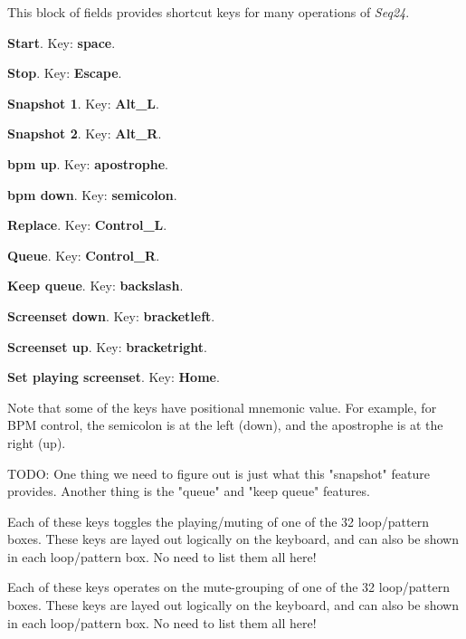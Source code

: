    This block of fields provides shortcut keys for many operations of
   \textsl{Seq24}.

   \begin{enumber}
      \item \textbf{Start}.
         Key:  \textbf{space}.
      \item \textbf{Stop}.
         Key:  \textbf{Escape}.
      \item \textbf{Snapshot 1}.
         Key:  \textbf{Alt\_L}.
      \item \textbf{Snapshot 2}.
         Key:  \textbf{Alt\_R}.
      \item \textbf{bpm up}.
         Key:  \textbf{apostrophe}.
      \item \textbf{bpm down}.
         Key:  \textbf{semicolon}.
      \item \textbf{Replace}.
         Key:  \textbf{Control\_L}.
      \item \textbf{Queue}.
         Key:  \textbf{Control\_R}.
      \item \textbf{Keep queue}.
         Key:  \textbf{backslash}.
      \item \textbf{Screenset down}.
         Key: \index{keys![} \textbf{bracketleft}.
      \item \textbf{Screenset up}.
         Key: \index{keys!]} \textbf{bracketright}.
      \item \textbf{Set playing screenset}.
         Key:  \textbf{Home}.
   \end{enumber}

   Note that some of the keys have positional mnemonic value.  For example,
   for BPM control, the semicolon is at the left (down), and the apostrophe
   is at the right (up).

   TODO: One thing we need to figure out is just what this "snapshot"
   feature provides.  Another thing is the "queue" and "keep queue"
   features.

   Each of these keys toggles the playing/muting of one of the 32
   loop/pattern boxes.  These keys are layed out logically on the keyboard,
   and can also be shown in each loop/pattern box.  No need to list them all
   here!

   Each of these keys operates on the mute-grouping of one of the 32
   loop/pattern boxes.  These keys are layed out logically on the keyboard,
   and can also be shown in each loop/pattern box.  No need to list them all
   here!

